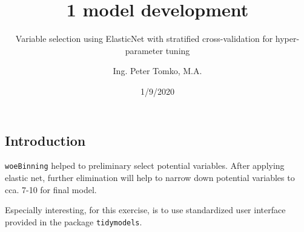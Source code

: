 \documentclass[
]{article}
\title{1 model development}
\subtitle{Variable selection using ElasticNet with stratified cross-validation for
hyper-parameter tuning}
\author{Ing. Peter Tomko, M.A.}
\date{1/9/2020}
\begin{document}
\maketitle

\hypertarget{introduction}{%
\subsection{Introduction}\label{introduction}}

\texttt{woeBinning} helped to preliminary select potential variables.
After applying elastic net, further elimination will help to narrow down
potential variables to cca. 7-10 for final model.

Especially interesting, for this exercise, is to use standardized user
interface provided in the package \texttt{tidymodels}.
\end{document}
